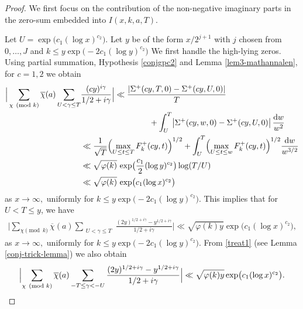 \documentclass[pdflatex]{sn-jnl}%
\newcommand{\dx}{\mathrm{d}}
\theoremstyle{sltheorems}
\theoremstyle{plainrem}
\theoremstyle{definition}
\begin{document}
\begin{proof} 
We first focus on the contribution of the non-negative 
imaginary parts in the zero-sum embedded into $I(x,k,a,T)$.

Let $U = \exp\bigl(c_1(\log x)^{c_2}\bigr)$.
Let $y$ be of the form $x/2^{j+1}$ with $j$ chosen from $0,\dotsc,J$
and $k\le y
\exp\bigl(- 2c_1 (\log y)^{c_2}\bigr)$
%
We first handle the high-lying zeros.
Using partial summation, Hypothesis \ref{conjgpc2} and Lemma
\ref{lem3-mathannalen}, for $c=1,2$ we obtain
\begin{align*}
\notag
  \Big \vert \sum_{\chi \pmod{k}}
  \overline{\chi}(a) \sum_{\substack{U <  \gamma \le  T} } 
  &\frac{(cy)^{ i\gamma}}{1/2 + i\gamma} \Big \vert  
  \nonumber
   \ll  \frac{\vert \Sigma^+(cy,T,0) - \Sigma^+(cy,U,0) \vert}{T}
   \\& \hskip3cm
\notag
  +
   \int_{U}^{T} 
   \bigl\vert
   \Sigma^+(cy,w,0) - \Sigma^+(cy,U,0)
   \bigr\vert
  \, \frac{\dx w}{w^2} \\
  \nonumber
  & \ll \frac{1}{\sqrt{T}} \Bigl(
\max_{U \le  t \le T}
F^+_k(cy,t) \Bigr)^{1/2} +
\int_{U}^{T} 
\Bigl(
\max_{U \le  t \le w}
F^+_k(cy,t) \Bigr)^{1/2} \frac{\dx w}{w^{3/2}}
\\
&\ll  \sqrt{{\varphi(k)}} \, 
\exp\bigl(\frac{c_1}{2} (\log y)^{c_2}\bigr)
\log(T/U)
\\&
\ll  \sqrt{{\varphi(k)}} \,
\exp\bigl(c_1(\log x)^{c_2}\bigr)
\end{align*}
as $x \to \infty,$ uniformly for $k\le y \exp\bigl(- 2c_1 (\log y)^{c_2}\bigr)$.
%
%
This implies that for $U < T \le  y$, we have
  \begin{align}\label{treat1}
\Big \vert  \sum_{\chi \pmod{k}}\overline{\chi}(a) \sum_{\substack{ U <  \gamma \le  T}
 } \frac{(2y)^{1/2+ i\gamma}-y^{1/2+i\gamma}}{1/2 + i\gamma} \Big \vert   
\ll \sqrt{{\varphi(k)}y}
\exp\bigl(c_1(\log x)^{c_2}\bigr),
   \end{align}
as $x \to \infty,$ uniformly for  $k\le y \exp\bigl(- 2c_1 (\log y)^{c_2}\bigr)$.
%
From \eqref{treat1} (see Lemma \ref{conj-trick-lemma}) we also obtain
%
\begin{equation}
\label{negative-interval}
\Bigl\vert
\sum_{\chi \pmod{k}}\overline{\chi}(a) \sum_{-T \le  \gamma < -U}
\frac{(2y)^{1/2+ i\gamma}-y^{1/2+i\gamma}}{1/2 + i\gamma}
\Bigr\vert
\ll \sqrt{{\varphi(k)}y}
 \exp\bigl(c_1(\log x)^{c_2}\bigr).
\end{equation}
%


\end{proof}
\end{document}
